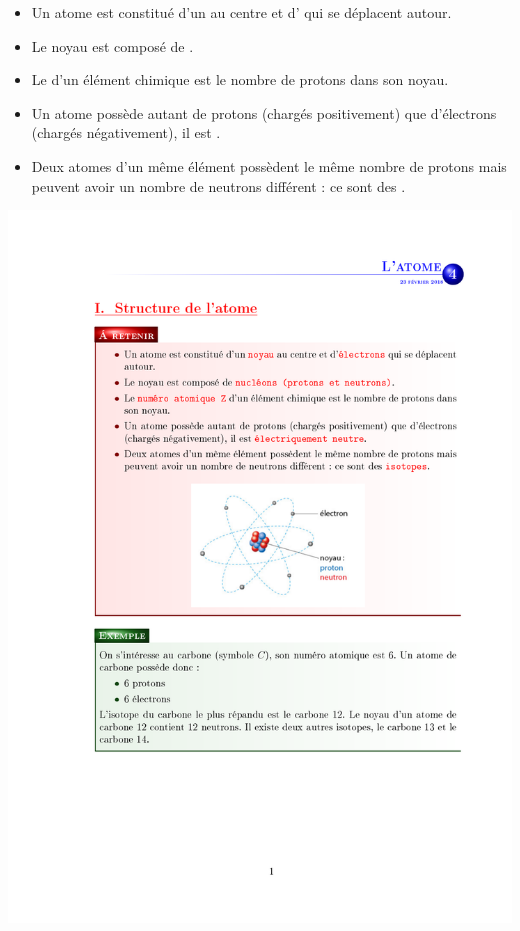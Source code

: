 \documentclass[12pt,a4paper]{article}
\begin{document}
\begin{mybilan}
	\begin{itemize}
		\item Un atome est constitué d'un  au centre et d' qui se déplacent autour.
		\item Le noyau est composé de .
		\item Le  d'un élément chimique est le nombre de protons dans son noyau.
		\item Un atome possède autant de protons (chargés positivement) que d'électrons (chargés négativement), il est .
		\item Deux atomes d'un même élément possèdent le même nombre de protons mais peuvent avoir un nombre de neutrons différent : ce sont des .
	\end{itemize}
	
	
	\begin{center}
		\includegraphics[scale=0.75]{atome}
	\end{center}

\end{mybilan}
\end{document}
